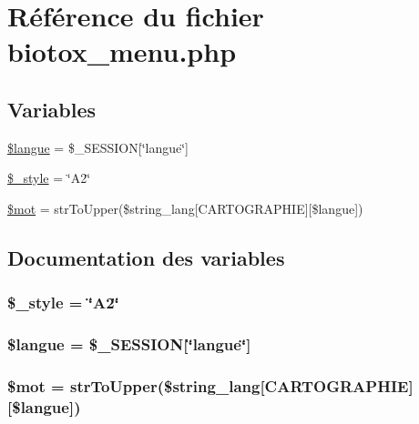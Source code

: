 \hypertarget{biotox__menu_8php}{
\section{R\'{e}f\'{e}rence du fichier biotox\_\-menu.php}
\label{biotox__menu_8php}
}
\subsection*{Variables}
\begin{CompactItemize}
\item 
\hyperlink{biotox__menu_8php_a0}{\$langue} = \$\_\-SESSION\mbox{[}\char`\"{}langue\char`\"{}\mbox{]}
\item 
\hyperlink{biotox__menu_8php_a1}{\$\_\-style} = \char`\"{}A2\char`\"{}
\item 
\hyperlink{biotox__menu_8php_a2}{\$mot} = str\-To\-Upper(\$string\_\-lang\mbox{[}CARTOGRAPHIE\mbox{]}\mbox{[}\$langue\mbox{]})
\end{CompactItemize}


\subsection{Documentation des variables}
\hypertarget{biotox__menu_8php_a1}{
\subsubsection[\$\_\-style]{\setlength{\rightskip}{0pt plus 5cm}\$\_\-style = \char`\"{}A2\char`\"{}}}
\label{biotox__menu_8php_a1}


\hypertarget{biotox__menu_8php_a0}{
\subsubsection[\$langue]{\setlength{\rightskip}{0pt plus 5cm}\$langue = \$\_\-SESSION\mbox{[}\char`\"{}langue\char`\"{}\mbox{]}}}
\label{biotox__menu_8php_a0}


\hypertarget{biotox__menu_8php_a2}{
\subsubsection[\$mot]{\setlength{\rightskip}{0pt plus 5cm}\$mot = str\-To\-Upper(\$string\_\-lang\mbox{[}CARTOGRAPHIE\mbox{]}\mbox{[}\$langue\mbox{]})}}
\label{biotox__menu_8php_a2}



